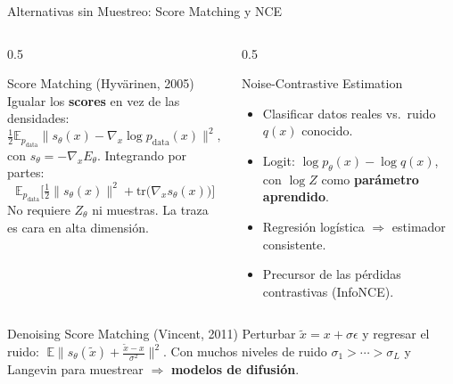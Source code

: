 \documentclass[aspectratio=169, 10pt]{beamer}
\providecommand{\E}{\mathbb{E}}
\newcommand{\pdata}{p_{\text{data}}}
\begin{document}
\begin{frame}{Alternativas sin Muestreo: Score Matching y NCE}

	\begin{columns}[T]
		\begin{column}{0.5\textwidth}
			\begin{block}{Score Matching (Hyv\"arinen, 2005)}
				\small
				Igualar los \textbf{scores} en vez de las densidades:
				\[
				\tfrac{1}{2}\E_{\pdata}\big\|s_\theta(x) - \nabla_x \log\pdata(x)\big\|^2,
				\]
				con $s_\theta = -\nabla_x E_\theta$. Integrando por partes:
				\[
				\E_{\pdata}\Big[\tfrac{1}{2}\|s_\theta(x)\|^2 + \mathrm{tr}\big(\nabla_x s_\theta(x)\big)\Big]
				\]
				No requiere $Z_\theta$ ni muestras. La traza es cara en alta dimensi\'on.
			\end{block}
		\end{column}

		\begin{column}{0.5\textwidth}
			\begin{block}{Noise-Contrastive Estimation}
				\small
				\begin{itemize}
					\item Clasificar datos reales vs.\ ruido $q(x)$ conocido.
					\item Logit: $\log p_\theta(x) - \log q(x)$, con $\log Z$ como \textbf{par\'ametro aprendido}.
					\item Regresi\'on log\'istica $\Rightarrow$ estimador consistente.
					\item Precursor de las p\'erdidas contrastivas (InfoNCE).
				\end{itemize}
			\end{block}
		\end{column}
	\end{columns}

	\vspace{0.2cm}

	\begin{alertblock}{Denoising Score Matching (Vincent, 2011)}
		Perturbar $\tilde x = x + \sigma\epsilon$ y regresar el ruido:
		$\;\E\big\|s_\theta(\tilde x) + \frac{\tilde x - x}{\sigma^2}\big\|^2$.
		Con muchos niveles de ruido $\sigma_1 > \cdots > \sigma_L$ y Langevin para muestrear $\Rightarrow$ \textbf{modelos de difusi\'on}.
	\end{alertblock}

\end{frame}
\end{document}
